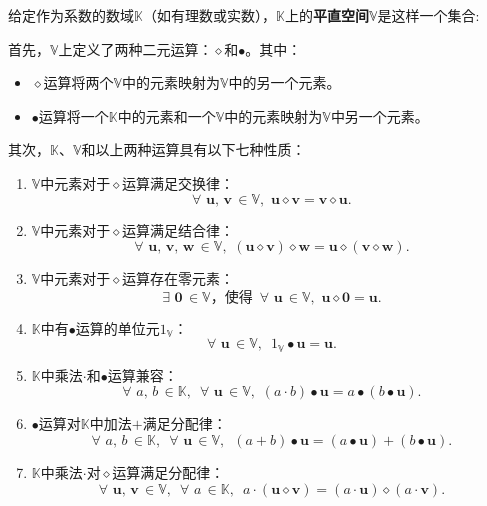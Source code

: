 \documentclass[12pt,UTF8,fontset=none]{ctexbook}
\begin{document}
\begin{df}
    给定作为系数的数域$\mathbb{K}$（如有理数或实数），$\mathbb{K}$上的\textbf{平直空间}$\mathbb{V}$是这样一个集合:

    首先，$\mathbb{V}$上定义了两种二元运算：$\diamond$和$\bullet$。其中：
    \begin{itemize}
        \item $\diamond$运算将两个$\mathbb{V}$中的元素映射为$\mathbb{V}$中的另一个元素。
        \item $\bullet$运算将一个$\mathbb{K}$中的元素和一个$\mathbb{V}$中的元素映射为$\mathbb{V}$中另一个元素。
    \end{itemize}
    其次，$\mathbb{K}$、$\mathbb{V}$和以上两种运算具有以下七种性质：
    \begin{enumerate}
        \item $\mathbb{V}$中元素对于$\diamond$运算满足交换律：
        $$\forall \,\, \mathbf{u}, \, \mathbf{v} \, \in \mathbb{V}, \,\, \mathbf{u} \diamond \mathbf{v} = \mathbf{v} \diamond \mathbf{u}.$$
        \item $\mathbb{V}$中元素对于$\diamond$运算满足结合律：
        $$\forall \,\, \mathbf{u}, \, \mathbf{v}, \, \mathbf{w} \, \in \mathbb{V}, \,\, (\mathbf{u} \diamond \mathbf{v}) \diamond \mathbf{w} = \mathbf{u} \diamond (\mathbf{v} \diamond \mathbf{w}).$$
        \item $\mathbb{V}$中元素对于$\diamond$运算存在零元素：
        $$\exists \,\, \mathbf{0} \, \in \mathbb{V} \mbox{，使得}\,\,\, \forall \,\, \mathbf{u} \, \in \mathbb{V}, \,\, \mathbf{u} \diamond \mathbf{0} = \mathbf{u}.$$
        \item $\mathbb{K}$中有$\bullet$运算的单位元$1_{\mathbb{V}}$：
        $$\forall \,\, \mathbf{u} \, \in \mathbb{V}, \,\,\, 1_{\mathbb{V}} \bullet \mathbf{u} = \mathbf{u}. $$
        \item $\mathbb{K}$中乘法$\cdot$和$\bullet$运算兼容：
        $$\forall \,\, a, \, b \, \in \mathbb{K}, \,\,\, \forall \,\, \mathbf{u} \, \in \mathbb{V}, \,\, (a \cdot b)\bullet\mathbf{u} = a \bullet (b\bullet\mathbf{u}).$$
        \item $\bullet$运算对$\mathbb{K}$中加法$+$满足分配律：
        $$\forall \,\, a, \, b \, \in \mathbb{K}, \,\,\, \forall \,\, \mathbf{u} \, \in \mathbb{V}, \,\,\, (a + b)\bullet\mathbf{u} = (a \bullet \mathbf{u}) + (b \bullet \mathbf{u}). $$
        \item $\mathbb{K}$中乘法$\cdot$对$\diamond$运算满足分配律：
        $$\forall \,\, \mathbf{u}, \, \mathbf{v} \, \in \mathbb{V}, \,\,\, \forall \,\, a \, \in \mathbb{K}, \,\,\, a\cdot(\mathbf{u} \diamond \mathbf{v}) = (a \cdot \mathbf{u}) \diamond (a \cdot \mathbf{v}). $$
    \end{enumerate}
\end{df}
\end{document}
